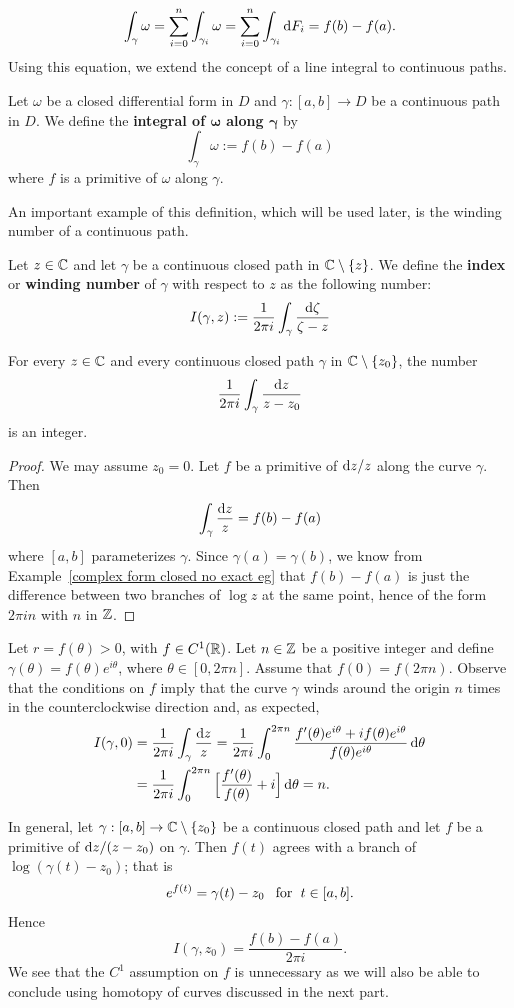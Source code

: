 \[\int_{\gamma}\omega=\sum_{i=0}^{n}\int_{\gamma_i}\omega=\sum_{i=0}^{n}\int_{\gamma_i}\mathop{}\!\mathrm{d} F_i=f(b)-f(a).\]
Using this equation, we extend the concept of a line integral to continuous paths.
\begin{definition}
Let $\omega$ be a closed differential form in $D$ and $\gamma:[a,b]\to D$ be a continuous path in $D$. We define the \textbf{integral of $\bm{\omega}$ along $\bm{\gamma}$} by
\[\int_{\gamma}\omega:=f(b)-f(a)\]
where $f$ is a primitive of $\omega$ along $\gamma$.
\end{definition}
An important example of this definition, which will be used later, is the winding number of a continuous path.
\begin{definition}
Let $z\in\mathbb{C}$ and let $\gamma$ be a continuous closed path in $\mathbb{C}\setminus\{z\}$. We define the \textbf{index} or \textbf{winding number} of $\gamma$ with respect to $z$ as the following number:
\[I(\gamma,z):=\frac{1}{2\pi i}\int_{\gamma}\frac{\mathop{}\!\mathrm{d}\zeta}{\zeta-z}\]
\end{definition}
\begin{proposition}
For every $z\in\mathbb{C}$ and every continuous closed path $\gamma$ in $\mathbb{C}\setminus\{z_0\}$, the number
\[\frac{1}{2\pi i}\int_{\gamma}\frac{\mathop{}\!\mathrm{d} z}{z-z_0}\]
is an integer.
\end{proposition}
\begin{proof}
We may assume $z_0=0$. Let $f$ be a primitive of $\mathop{}\!\mathrm{d} z/z$ along the curve $\gamma$. Then
\[\int_{\gamma}\frac{\mathop{}\!\mathrm{d} z}{z}=f(b)-f(a)\]
where $[a,b]$ parameterizes $\gamma$. Since $\gamma(a)=\gamma(b)$, we know from Example~\ref{complex form closed no exact eg} that $f(b)-f(a)$ is just the difference between two branches of $\log z$ at the same point, hence of the form $2\pi in$ with $n$ in $\mathbb{Z}$.
\end{proof}
\begin{example}
Let $r=f(\theta)>0$, with $f\in C^1(\mathbb{R})$. Let $n\in\mathbb{Z}$ be a positive integer and define $\gamma(\theta)=f(\theta)e^{i\theta}$, where $\theta\in[0,2\pi n]$. Assume that $f(0)=f(2\pi n)$. Observe that the conditions on $f$ imply that the curve $\gamma$ winds around the origin $n$ times in the counterclockwise direction and, as expected,
\begin{align*}
I(\gamma,0)&=\frac{1}{2\pi i}\int_{\gamma}\frac{\mathop{}\!\mathrm{d} z}{z}=\frac{1}{2\pi i}\int_{0}^{2\pi n}\frac{f'(\theta)e^{i\theta}+if(\theta)e^{i\theta}}{f(\theta)e^{i\theta}}\mathop{}\!\mathrm{d}\theta\\
&=\frac{1}{2\pi i}\int_{0}^{2\pi n}\Big[\frac{f'(\theta)}{f(\theta)}+i\Big]\mathop{}\!\mathrm{d} \theta=n.
\end{align*}
\end{example}
In general, let $\gamma:[a,b]\to\mathbb{C}\setminus\{z_0\}$ be a continuous closed path and let $f$ be a primitive of $\mathop{}\!\mathrm{d} z/(z-z_0)$ on $\gamma$. Then $f(t)$ agrees with a branch of $\log(\gamma(t)-z_0)$; that is
\[e^{f(t)}=\gamma(t)-z_0\hspace{8pt}\text{for}\hspace{6pt} t\in[a,b].\]
Hence
\[I(\gamma,z_0)=\frac{f(b)-f(a)}{2\pi i}.\]
We see that the $C^1$ assumption on $f$ is unnecessary as we will also be able to conclude using homotopy of curves discussed in the next part.
